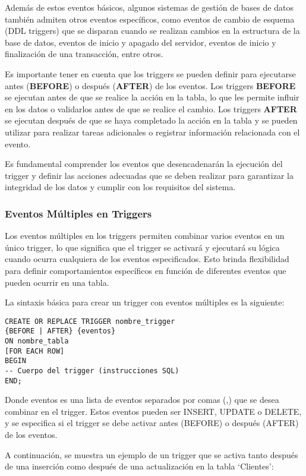 \documentclass[executivepaper]{article}
\begin{document}
Además de estos eventos básicos, algunos sistemas de gestión de bases de datos también admiten otros eventos específicos, como eventos de cambio de esquema (DDL triggers) que se disparan cuando se realizan cambios en la estructura de la base de datos, eventos de inicio y apagado del servidor, eventos de inicio y finalización de una transacción, entre otros.

Es importante tener en cuenta que los triggers se pueden definir para ejecutarse antes (\textbf{BEFORE}) o después (\textbf{AFTER}) de los eventos. Los triggers \textbf{BEFORE} se ejecutan antes de que se realice la acción en la tabla, lo que les permite influir en los datos o validarlos antes de que se realice el cambio. Los triggers \textbf{AFTER} se ejecutan después de que se haya completado la acción en la tabla y se pueden utilizar para realizar tareas adicionales o registrar información relacionada con el evento.

Es fundamental comprender los eventos que desencadenarán la ejecución del trigger y definir las acciones adecuadas que se deben realizar para garantizar la integridad de los datos y cumplir con los requisitos del sistema.

\subsubsection*{Eventos Múltiples en Triggers}

Los eventos múltiples en los triggers permiten combinar varios eventos en un único trigger, lo que significa que el trigger se activará y ejecutará su lógica cuando ocurra cualquiera de los eventos especificados. Esto brinda flexibilidad para definir comportamientos específicos en función de diferentes eventos que pueden ocurrir en una tabla.

La sintaxis básica para crear un trigger con eventos múltiples es la siguiente:

\begin{lstlisting}
CREATE OR REPLACE TRIGGER nombre_trigger
{BEFORE | AFTER} {eventos}
ON nombre_tabla
[FOR EACH ROW]
BEGIN
-- Cuerpo del trigger (instrucciones SQL)
END;
\end{lstlisting}

Donde {eventos} es una lista de eventos separados por comas (,) que se desea combinar en el trigger. Estos eventos pueden ser INSERT, UPDATE o DELETE, y se especifica si el trigger se debe activar antes (BEFORE) o después (AFTER) de los eventos.

A continuación, se muestra un ejemplo de un trigger que se activa tanto después de una inserción como después de una actualización en la tabla \enquote*{Clientes}:
\end{document}

